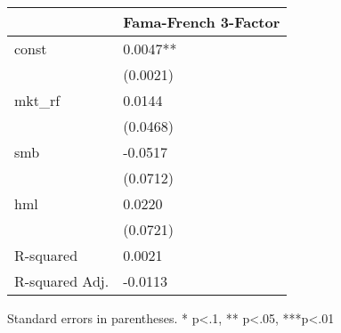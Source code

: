 \begin{table}
\caption{}
\label{}
\begin{center}
\begin{tabular}{ll}
\hline
               & Fama-French 3-Factor  \\
\hline
const          & 0.0047**              \\
               & (0.0021)              \\
mkt\_rf        & 0.0144                \\
               & (0.0468)              \\
smb            & -0.0517               \\
               & (0.0712)              \\
hml            & 0.0220                \\
               & (0.0721)              \\
R-squared      & 0.0021                \\
R-squared Adj. & -0.0113               \\
\hline
\end{tabular}
\end{center}
\end{table}
\bigskip
Standard errors in parentheses. \newline 
* p<.1, ** p<.05, ***p<.01